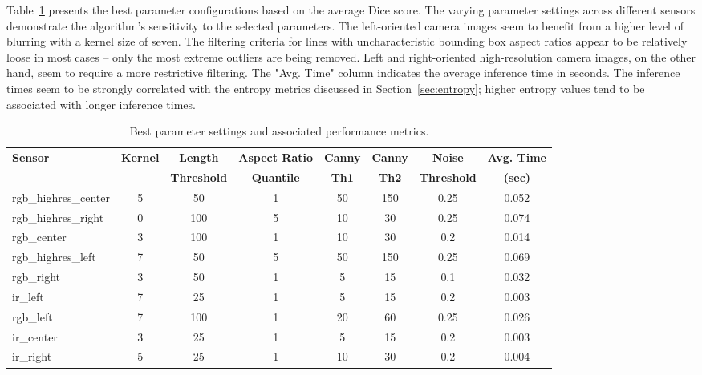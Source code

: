 \documentclass[Master,MDS,english]{BASE/twbook} %
\begin{document}
Table~\ref{tab:sensor_parameters} presents the best parameter configurations based on the average Dice score. The varying parameter settings across different sensors demonstrate the algorithm's sensitivity to the selected parameters.
The left-oriented camera images seem to benefit from a higher level of blurring with a kernel size of seven. 
The filtering criteria for lines with uncharacteristic bounding box aspect ratios appear to be relatively loose in most cases -- only the most extreme outliers are being removed. Left and right-oriented high-resolution camera images, on the other hand, seem to require a more restrictive filtering. 
The "Avg. Time" column indicates the average inference time in seconds. The inference times seem to be strongly correlated with the entropy metrics discussed in Section~\ref{sec:entropy}; higher entropy values tend to be associated with longer inference times.


\begin{table}[htbp]
\footnotesize
    \centering
    \begin{tabular}{|l|c|c|c|c|c|c|c|}
        \hline
        \textbf{Sensor} & \textbf{Kernel} & \textbf{Length}  & \textbf{Aspect Ratio } & \textbf{Canny } & \textbf{Canny } & \textbf{Noise} & \textbf{Avg. Time } \\
         &  & \textbf{Threshold} & \textbf{Quantile} & \textbf{Th1} & \textbf{Th2} & \textbf{Threshold} & \textbf{(sec)} \\
        \hline
        rgb\_highres\_center & 5 & 50 & 1 & 50 & 150 & 0.25 & 0.052 \\
        rgb\_highres\_right & 0 & 100 & 5 & 10 & 30 & 0.25 & 0.074 \\
        rgb\_center & 3 & 100 & 1 & 10 & 30 & 0.2 & 0.014 \\
        rgb\_highres\_left & 7 & 50 & 5 & 50 & 150 & 0.25 & 0.069 \\
        rgb\_right & 3 & 50 & 1 & 5 & 15 & 0.1 & 0.032 \\
        ir\_left & 7 & 25 & 1 & 5 & 15 & 0.2 & 0.003 \\
        rgb\_left & 7 & 100 & 1 & 20 & 60 & 0.25 & 0.026 \\
        ir\_center & 3 & 25 & 1 & 5 & 15 & 0.2 & 0.003 \\
        ir\_right & 5 & 25 & 1 & 10 & 30 & 0.2 & 0.004 \\
        \hline
    \end{tabular}
      \caption{Best parameter settings and associated performance metrics.}
    \label{tab:sensor_parameters}
\end{table}
\end{document}
